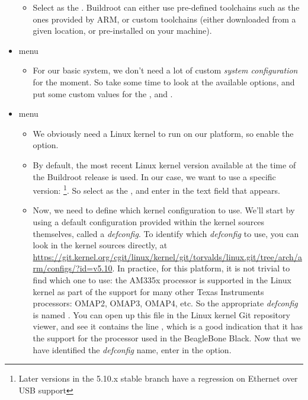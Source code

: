 \begin{itemize}
\begin{itemize}
  \item Select  as the
    . Buildroot can either use pre-defined toolchains
    such as the ones provided by ARM, or custom toolchains (either
    downloaded from a given location, or pre-installed on your
    machine).

  \end{itemize}

\item {} menu

  \begin{itemize}

  \item For our basic system, we don't need a lot of custom {\em
      system configuration} for the moment. So take some time to look
    at the available options, and put some custom values for the
    ,  and .

  \end{itemize}

\item {} menu

  \begin{itemize}

  \item We obviously need a Linux kernel to run on our platform, so
    enable the  option.

  \item By default, the most recent Linux kernel version available at
    the time of the Buildroot release is used. In our case, we want to
    use a specific version: \footnote{Later versions in
      the 5.10.x stable branch have a regression on Ethernet over USB
      support}. So select  as the , and enter  in the 
    text field that appears.

  \item Now, we need to define which kernel configuration to
    use. We'll start by using a default configuration provided within
    the kernel sources themselves, called a {\em defconfig}. To
    identify which {\em defconfig} to use, you can look in the kernel
    sources directly, at
    \url{https://git.kernel.org/cgit/linux/kernel/git/torvalds/linux.git/tree/arch/arm/configs/?id=v5.10}. In
    practice, for this platform, it is not trivial to find which one
    to use: the AM335x processor is supported in the Linux kernel as
    part of the support for many other Texas Instruments processors:
    OMAP2, OMAP3, OMAP4, etc. So the appropriate {\em defconfig} is
    named . You can open up this file in the
    Linux kernel Git repository viewer, and see it contains the line
    , which is a good indication that it has
    the support for the processor used in the BeagleBone Black. Now
    that we have identified the {\em defconfig} name, enter
     in the  option.


\end{itemize}
\end{itemize}
